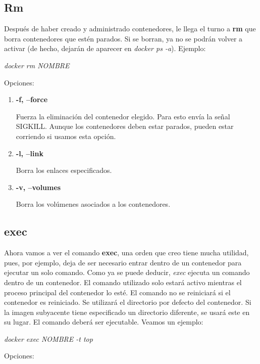 \documentclass[]{article}
\begin{document}
\subsection{Rm}

Después de haber creado y administrado contenedores, le llega el turno a {\bf rm} que borra contenedores que estén parados.
Si se borran, ya no se podrán volver a activar (de hecho, dejarán de aparecer en {\it docker ps -a}).
Ejemplo:

\begin{center}
	\it
	docker rm NOMBRE
\end{center}

Opciones:

\begin{enumerate}
	\renewcommand{\labelenumi}{$ \bullet $}
	\item {\bf -f, --force}
	
	Fuerza la eliminación del contenedor elegido. Para esto envía la señal SIGKILL. 
	Aunque los contenedores deben estar parados, pueden estar corriendo si usamos esta opción.
	\item {\bf -l, --link}
	
	Borra los enlaces especificados.
	\item {\bf -v, --volumes}
	
	Borra los volúmenes asociados a los contenedores.
\end{enumerate}

\subsection{exec}

Ahora vamos a ver el comando {\bf exec}, una orden que creo tiene mucha utilidad, pues, por ejemplo, deja de ser necesario entrar dentro de un contenedor para ejecutar un solo comando.
Como ya se puede deducir, {\it exec} ejecuta un comando dentro de un contenedor.
El comando utilizado solo estará activo mientras el proceso principal del contenedor lo esté.
El comando no se reiniciará si el contenedor es reiniciado.
Se utilizará el directorio por defecto del contenedor.
Si la imagen subyacente tiene especificado un directorio diferente, se usará este en su lugar. 
El comando deberá ser ejecutable.
Veamos un ejemplo:
\begin{center}
	\it
	docker exec NOMBRE -t top
\end{center}

Opciones:
\end{document}
